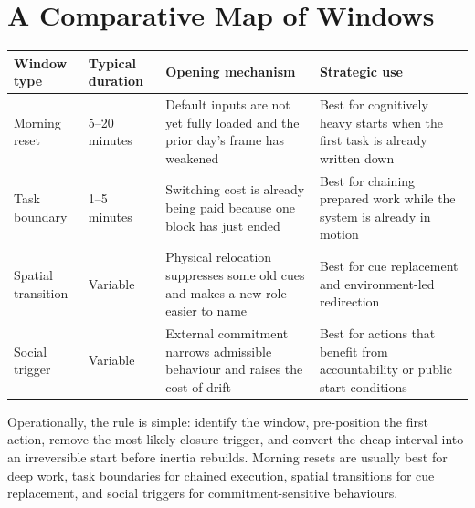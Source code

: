 \section{A Comparative Map of Windows}

\begin{center}
\begin{tabularx}{\textwidth}{@{}l l >{\raggedright\arraybackslash}X >{\raggedright\arraybackslash}X@{}}
\toprule
Window type & Typical duration & Opening mechanism & Strategic use \\
\midrule
Morning reset & 5--20 minutes & Default inputs are not yet fully loaded and the prior day's frame has weakened & Best for cognitively heavy starts when the first task is already written down \\
Task boundary & 1--5 minutes & Switching cost is already being paid because one block has just ended & Best for chaining prepared work while the system is already in motion \\
Spatial transition & Variable & Physical relocation suppresses some old cues and makes a new role easier to name & Best for cue replacement and environment-led redirection \\
Social trigger & Variable & External commitment narrows admissible behaviour and raises the cost of drift & Best for actions that benefit from accountability or public start conditions \\
\bottomrule
\end{tabularx}
\end{center}

\begin{discussion}
Operationally, the rule is simple: identify the window, pre-position the first
action, remove the most likely closure trigger, and convert the cheap interval
into an irreversible start before inertia rebuilds. Morning resets are usually
best for deep work, task boundaries for chained execution, spatial transitions
for cue replacement, and social triggers for commitment-sensitive behaviours.
\end{discussion}
